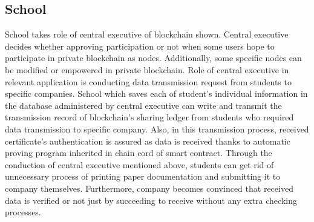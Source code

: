 \documentclass[conference]{IEEEtran}
\begin{document}
\subsection{School}
School takes role of central executive of blockchain shown. Central executive decides whether approving participation or not when some users hope to participate in private blockchain as nodes. Additionally, some specific nodes can be modified or empowered in private blockchain. Role of central executive in relevant application is conducting data transmission request from students to specific companies. School which saves each of student’s individual information in the database administered by central executive can write and transmit the transmission record of blockchain’s sharing ledger from students who required data transmission to specific company. Also, in this transmission process, received certificate’s authentication is assured as data is received thanks to automatic proving program inherited in chain cord of smart contract. Through the conduction of central executive mentioned above, students can get rid of unnecessary process of printing paper documentation and submitting it to company themselves. Furthermore, company becomes convinced that received data is verified or not just by succeeding to receive without any extra checking processes.\\
\end{document}
